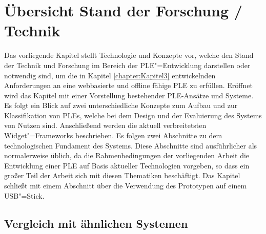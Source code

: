 \chapter{Übersicht Stand der Forschung / Technik}\label{chapter:Kapitel4}

Das vorliegende Kapitel stellt Technologie und Konzepte vor, welche den Stand der Technik und Forschung im Bereich der \ac{PLE}"=Entwicklung darstellen oder notwendig sind, um die in Kapitel \ref{chapter:Kapitel3} entwickelnden Anforderungen an eine webbasierte und offline fähige \ac{PLE} zu erfüllen. Eröffnet wird das Kapitel mit einer Vorstellung bestehender \ac{PLE}-Ansätze und Systeme. Es folgt ein Blick auf zwei unterschiedliche Konzepte zum Aufbau und zur Klassifikation von \acp{PLE}, welche bei dem Design und der Evaluierung des Systems von Nutzen sind. Anschließend werden die aktuell verbreitetsten Widget"=Frameworks beschrieben. Es folgen zwei Abschnitte zu dem technologischen Fundament des Systems. Diese Abschnitte sind ausführlicher als normalerweise üblich, da die Rahmenbedingungen der vorliegenden Arbeit die Entwicklung einer \ac{PLE} auf Basis aktueller Technologien vorgeben, so dass ein großer Teil der Arbeit sich mit diesen Thematiken beschäftigt. Das Kapitel schließt mit einem Abschnitt über die Verwendung des Prototypen auf einem USB"=Stick. 

\section{Vergleich mit ähnlichen Systemen}\label{section:aehnliche_systeme}

